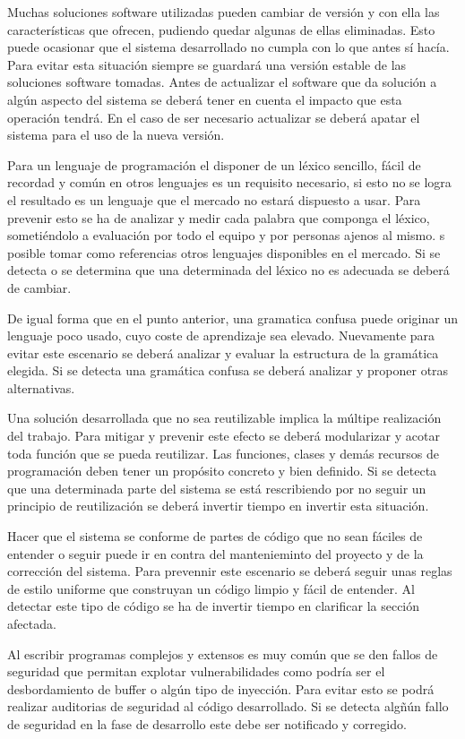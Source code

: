 Muchas soluciones software utilizadas pueden cambiar de versión y con ella las características que ofrecen, pudiendo quedar algunas de ellas eliminadas. Esto 
puede ocasionar que el sistema desarrollado no cumpla con lo que antes sí hacía. Para evitar esta situación siempre se guardará una versión estable de las 
soluciones software tomadas. Antes de actualizar el software que da solución a algún aspecto del sistema se deberá tener en cuenta el impacto que esta operación 
tendrá. En el caso de ser necesario actualizar se deberá apatar el sistema para el uso de la nueva versión. 

Para un lenguaje de programación el disponer de un léxico sencillo, fácil de recordad y común en otros lenguajes es un requisito necesario, si esto no se logra 
el resultado es un lenguaje que el mercado no estará dispuesto a usar. Para prevenir esto se ha de analizar y medir cada palabra que componga el léxico, sometiéndolo 
a evaluación por todo el equipo y por personas ajenos al mismo. s posible tomar como referencias otros lenguajes disponibles en el mercado. 
Si se detecta o se determina que una determinada del léxico no es adecuada se deberá de cambiar. 

De igual forma que en el punto anterior, una gramatica confusa puede originar un lenguaje poco usado, cuyo coste de aprendizaje sea elevado. Nuevamente para evitar este
escenario se deberá analizar y evaluar la estructura de la gramática elegida. Si se detecta una gramática confusa se deberá analizar y proponer otras alternativas.

Una solución desarrollada que no sea reutilizable implica la múltipe realización del trabajo. Para mitigar y prevenir este efecto se deberá modularizar y acotar toda 
función que se pueda reutilizar. Las funciones, clases y demás recursos de programación deben tener un propósito concreto y bien definido. Si se detecta que una determinada parte del 
sistema se está rescribiendo por no seguir un principio de reutilización se deberá invertir tiempo en invertir esta situación.

Hacer que el sistema se conforme de partes de código que no sean fáciles de entender o seguir puede ir en contra del mantenieminto del proyecto y de la corrección del sistema. Para prevennir 
este escenario se deberá seguir unas reglas de estilo uniforme que construyan un código limpio y fácil de entender. Al detectar este tipo de código se ha de invertir tiempo en clarificar la
sección afectada. 

Al escribir programas complejos y extensos es muy común que se den fallos de seguridad que permitan explotar vulnerabilidades como podría ser el desbordamiento de buffer o 
algún tipo de inyección. Para evitar esto se podrá realizar auditorias de seguridad al código desarrollado. Si se detecta algñún fallo de seguridad en la fase de desarrollo este 
debe ser notificado y corregido. 




